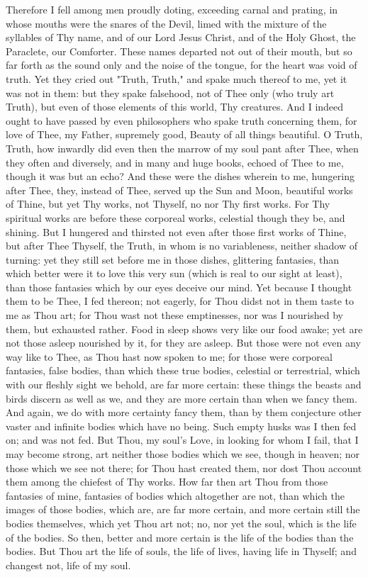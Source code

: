 \documentclass[b5paper,openright,12pt,twoside]{book}
\begin{document}
Therefore I fell among men proudly doting, exceeding carnal and prating,
in whose mouths were the snares of the Devil, limed with the mixture of
the syllables of Thy name, and of our Lord Jesus Christ, and of the Holy
Ghost, the Paraclete, our Comforter. These names departed not out of
their mouth, but so far forth as the sound only and the noise of the
tongue, for the heart was void of truth. Yet they cried out "Truth,
Truth," and spake much thereof to me, yet it was not in them: but they
spake falsehood, not of Thee only (who truly art Truth), but even of
those elements of this world, Thy creatures. And I indeed ought to have
passed by even philosophers who spake truth concerning them, for love
of Thee, my Father, supremely good, Beauty of all things beautiful.
O Truth, Truth, how inwardly did even then the marrow of my soul pant
after Thee, when they often and diversely, and in many and huge books,
echoed of Thee to me, though it was but an echo? And these were the
dishes wherein to me, hungering after Thee, they, instead of Thee,
served up the Sun and Moon, beautiful works of Thine, but yet Thy works,
not Thyself, no nor Thy first works. For Thy spiritual works are before
these corporeal works, celestial though they be, and shining. But I
hungered and thirsted not even after those first works of Thine, but
after Thee Thyself, the Truth, in whom is no variableness, neither
shadow of turning: yet they still set before me in those dishes,
glittering fantasies, than which better were it to love this very sun
(which is real to our sight at least), than those fantasies which by
our eyes deceive our mind. Yet because I thought them to be Thee, I fed
thereon; not eagerly, for Thou didst not in them taste to me as Thou
art; for Thou wast not these emptinesses, nor was I nourished by them,
but exhausted rather. Food in sleep shows very like our food awake; yet
are not those asleep nourished by it, for they are asleep. But those
were not even any way like to Thee, as Thou hast now spoken to me; for
those were corporeal fantasies, false bodies, than which these true
bodies, celestial or terrestrial, which with our fleshly sight we
behold, are far more certain: these things the beasts and birds discern
as well as we, and they are more certain than when we fancy them. And
again, we do with more certainty fancy them, than by them conjecture
other vaster and infinite bodies which have no being. Such empty husks
was I then fed on; and was not fed. But Thou, my soul's Love, in looking
for whom I fail, that I may become strong, art neither those bodies
which we see, though in heaven; nor those which we see not there; for
Thou hast created them, nor dost Thou account them among the chiefest of
Thy works. How far then art Thou from those fantasies of mine, fantasies
of bodies which altogether are not, than which the images of those
bodies, which are, are far more certain, and more certain still the
bodies themselves, which yet Thou art not; no, nor yet the soul, which
is the life of the bodies. So then, better and more certain is the life
of the bodies than the bodies. But Thou art the life of souls, the life
of lives, having life in Thyself; and changest not, life of my soul.
\end{document}

